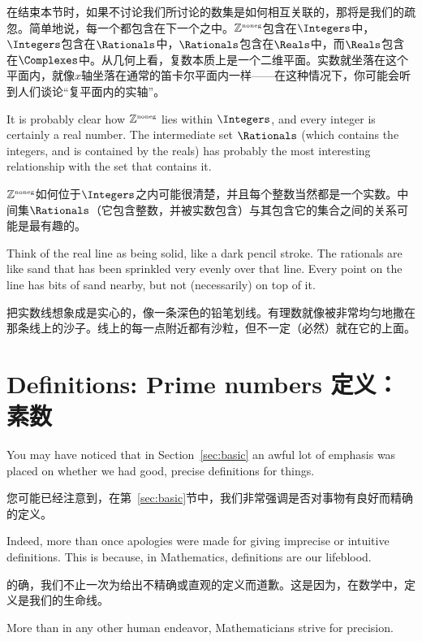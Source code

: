 在结束本节时，如果不讨论我们所讨论的数集是如何相互关联的，那将是我们的疏忽。简单地说，每一个都包含在下一个之中。${\mathbb Z}^{\mbox{\tiny noneg}}$包含在$\Integers$中，$\Integers$包含在$\Rationals$中，$\Rationals$包含在$\Reals$中，而$\Reals$包含在$\Complexes$中。从几何上看，复数本质上是一个二维平面。实数就坐落在这个平面内，就像$x$轴坐落在通常的笛卡尔平面内一样——在这种情况下，你可能会听到人们谈论“复平面内的实轴”。

It is probably clear how ${\mathbb Z}^{\mbox{\tiny noneg}}$ lies within $\Integers$, and 
every integer is certainly a real number. The intermediate set
$\Rationals$ (which contains the integers, and is contained by the
reals) has probably the most interesting relationship with the
set that contains it.

${\mathbb Z}^{\mbox{\tiny noneg}}$如何位于$\Integers$之内可能很清楚，并且每个整数当然都是一个实数。中间集$\Rationals$（它包含整数，并被实数包含）与其包含它的集合之间的关系可能是最有趣的。

Think of the real line as being solid, like
a dark pencil stroke. The rationals are like sand that has been
sprinkled very evenly over that line. Every point on the line
 has bits of sand nearby, but not (necessarily) on top of it.

把实数线想象成是实心的，像一条深色的铅笔划线。有理数就像被非常均匀地撒在那条线上的沙子。线上的每一点附近都有沙粒，但不一定（必然）就在它的上面。

\newpage




\newpage

\section{Definitions: Prime numbers 定义：素数}
\label{sec:def}

You may have noticed that in Section~\ref{sec:basic} an awful lot of
emphasis was placed on whether we had good, precise definitions
for things.

您可能已经注意到，在第~\ref{sec:basic}节中，我们非常强调是否对事物有良好而精确的定义。

Indeed, more than once apologies were made for giving
imprecise or intuitive definitions.  This is because, in Mathematics,
definitions are our lifeblood.

的确，我们不止一次为给出不精确或直观的定义而道歉。这是因为，在数学中，定义是我们的生命线。

More than in any other human 
endeavor, Mathematicians strive for precision.

